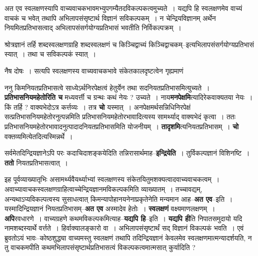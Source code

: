 \documentclass[article,12pt,a4paper]{memoir}
\begin{document}
	  \pstart अत एव स्वलक्षणस्यापि वाच्यवाचकभावमभ्युपगम्यैतदविकल्पकत्वमुच्यते । यद्यपि हि स्वलक्षणमेव वाच्यं वाचकं च भवेत् तथापि अभिलापसंसृष्टार्थ विज्ञानं सविकल्पकम् । न चेन्द्रियविज्ञानम् अर्थेन नियमितप्रतिभासत्वाद् अभिलापसंसर्गयोग्यप्रतिभासं भवतीति निर्विकल्पक्रम् ।
	\pend
        

	  \pstart श्रोत्रज्ञानं तर्हि शब्दस्वलक्षणग्राहि शब्दस्वलक्षणं च किञ्चिद्वाच्यं किञ्चिद्वाचकम्--इत्यभिलापसंसर्गयोग्यप्रतिभासं स्यात् । तथा च सविकल्पकं स्यात् ।
	\pend
        

	  \pstart नैष दोषः । सत्यपि स्वलक्षणस्य वाच्यवाचकभावे संकेतकालदृष्टत्वेन गृह्यमाणं
	\pend
      
	  \endgroup
	

	  \pstart ननु किमनियतप्रतिभासत्वे साध्येऽर्थनिरपेक्षत्वं हेतुर्येन तथा सदनियतप्रतिभासमित्युच्यते । \textbf{प्रतिभासनियमहेतोरिति च} मध्यवर्त्ती च ग्रन्थः कथं नेयः ? उच्यते । नाय\textbf{मनपेक्षमि}त्यादिरेकवाक्यतया नेयः । किं तर्हि ? वाक्यभेदोऽत्र कर्त्तव्यः । तत्र \textbf{चो} यस्मात् । अनपेक्षमर्थसन्निधिनिरपेक्षं सत्प्रतिभासनियमहेतोरनुत्पन्नमिति प्रतिभासनियमहेतोरभावादित्यस्य सामर्थ्याद् वाक्यभेदं कृत्वा । ततः प्रतिभासनियमहेतोरभावादनुत्पादादनियतप्रतिभासमिति योजनीयम् । \textbf{तादृशमि}त्यनियतप्रतिभासम् । \textbf{चो} वक्तव्यमित्येतदित्यस्मिन्नर्थे ।
	\pend
      

	  \pstart सर्वमेतदिन्द्रियज्ञानेऽपि परः कदाचिदाशङ्कयेदिति तन्निरासार्थमाह--\textbf{इन्द्रियेति} । तुर्विकल्पज्ञानं विशिनष्टि । \textbf{ततो} नियतप्रतिभासत्वात् ।
	\pend
      

	  \pstart इह पूर्वव्याख्यातृभिः असामर्थ्यवैयर्थ्याभ्यां स्वलक्षणस्य संकेतयितुमशक्यत्वादवाच्यवाचकत्वम् । अवाच्यावाचकस्वलक्षणग्राहित्वाच्चेन्द्रियज्ञानमविकल्पकमिति व्याख्यातम् । तच्चावद्यम्, अन्यथाऽप्यविकल्पत्वस्य सुसाधत्वात् किमन्यापोहानयनेनाप्रकृतेनेति मन्यमान आह--\textbf{अत एव}--इति । यस्मादिन्द्रियज्ञानं नियतप्रतिभासम्--\textbf{अत एव} अस्मादेव हेतोः । \textbf{स्वलक्षणं} वक्ष्यमाणलक्षणम् । \textbf{अपि}रवधारणे । वाच्यग्रहणे कथमविकल्पकमित्याह--\textbf{यद्यपि हि}--इति । \textbf{यद्यपि ही}ति निपातसमुदायो यदि नामशब्दस्यार्थे वर्त्तते । हिर्वाक्यालङ्कारो वा । अभिलापसंसृष्टार्थं सद् विज्ञानं विकल्पकं भवति । एवं ब्रुवतोऽयं भावः--कोष्ठशुद्ध्या वाच्यमस्तु स्वलक्षणं तथापि तदिन्द्रियज्ञानं केवलमेव स्वलक्षणमात्मन्यादर्शयति, न तु वाचकमपीति कथमभिलापसंसृष्टार्थप्रतिभासत्वं विकल्पकत्वमात्मसात् कुर्यादिति ?
	\pend
	  \bigskip
	  \begingroup
	
\end{document}
